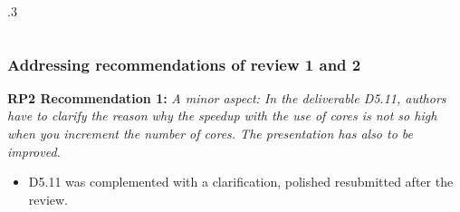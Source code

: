 \documentclass{beamer}
\begin{document}
\begin{frame}
\begin{description}
\begin{columns}
\begin{column} {.3\textwidth}
\begin{center}
        \end{center}
      \end{column}
    \end{columns}
\end{description}
 \end{frame}

 \begin{frame}
 \frametitle{Addressing recommendations of review 1 and 2}
 \textbf{RP2 Recommendation 1:} \textit{
A minor aspect: In the deliverable D5.11, authors have to clarify the
reason why the speedup with the use of cores is not so high when you increment the number of
cores. The presentation has also to be improved.}
      \begin{itemize}
      \item D5.11 was complemented with a clarification, polished resubmitted after the review.
      \end{itemize}

 \end{frame}
\end{document}
